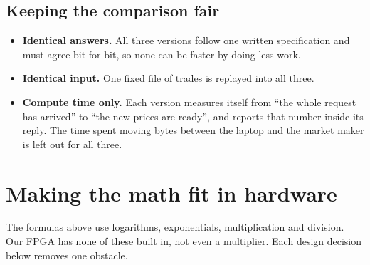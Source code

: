 \documentclass[11pt]{article}
\begin{document}
\subsection{Keeping the comparison fair}

\begin{itemize}
  \item \textbf{Identical answers.} All three versions follow one written
        specification and must agree bit for bit, so none can be faster by
        doing less work.
  \item \textbf{Identical input.} One fixed file of trades is replayed into
        all three.
  \item \textbf{Compute time only.} Each version measures itself from ``the
        whole request has arrived'' to ``the new prices are ready'', and
        reports that number inside its reply. The time spent moving bytes
        between the laptop and the market maker is left out for all three.
\end{itemize}

\section{Making the math fit in hardware}

The formulas above use logarithms, exponentials, multiplication and division.
Our FPGA has none of these built in, not even a multiplier. Each design
decision below removes one obstacle.
\end{document}
